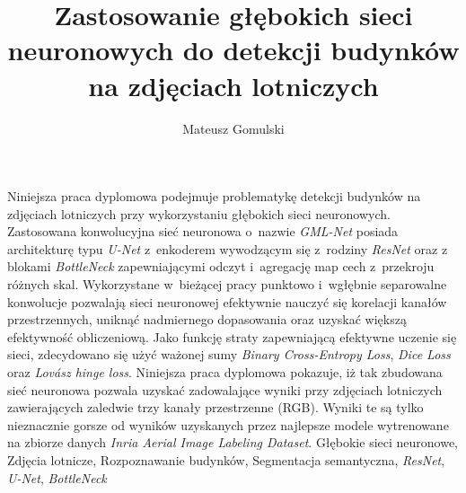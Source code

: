 \documentclass[left=2.5cm, right=2.5cm, top=2.5cm, bottom=3cm, bindingoffset=6mm, nohyphenation=false]{Pakiety/thesis}
\begin{document}
\Thesis
{}
\title{Zastosowanie głębokich sieci neuronowych do detekcji budynków na zdjęciach lotniczych}
\author{Mateusz Gomulski}
\date{\the\year}
\maketitle

\clearpage
\streszczenie 
Niniejsza praca dyplomowa podejmuje problematykę detekcji budynków na zdjęciach lotniczych przy wykorzystaniu głębokich sieci neuronowych. Zastosowana konwolucyjna sieć neuronowa o~nazwie \textit{GML-Net} posiada architekturę typu \textit{U-Net} z~enkoderem wywodzącym się z~rodziny \textit{ResNet} oraz z blokami \textit{BottleNeck} zapewniającymi odczyt i~agregację map cech z~przekroju różnych skal. Wykorzystane w~bieżącej pracy punktowo i~wgłębnie separowalne konwolucje pozwalają sieci neuronowej efektywnie nauczyć się korelacji kanałów przestrzennych, uniknąć nadmiernego dopasowania oraz uzyskać większą efektywność obliczeniową. Jako funkcję straty zapewniającą efektywne uczenie się sieci, zdecydowano się użyć ważonej sumy \textit{Binary Cross-Entropy Loss}, \textit{Dice Loss} oraz \textit{Lovász hinge loss}. Niniejsza praca dyplomowa pokazuje, iż tak zbudowana sieć neuronowa pozwala uzyskać zadowalające wyniki przy zdjęciach lotniczych zawierających zaledwie trzy kanały przestrzenne (RGB). Wyniki te są tylko nieznacznie gorsze od wyników uzyskanych przez najlepsze modele wytrenowane na zbiorze danych \textit{Inria Aerial Image Labeling Dataset}.
\slowakluczowe Głębokie sieci neuronowe, Zdjęcia lotnicze, Rozpoznawanie budynków, Segmentacja semantyczna, \textit{ResNet}, \textit{U-Net}, \textit{BottleNeck}
\end{document}
